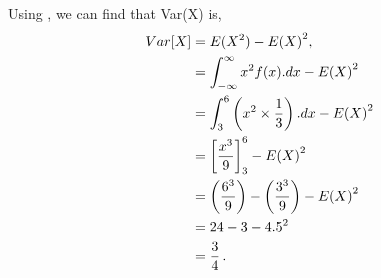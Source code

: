 \begin{subquestions}
\begin{subsubquestions}
Using , we can find that Var(X) is,
\begin{align}
	Var[X] & = E(X^2) - {E(X)}^2, \nonumber \\\
		   & = \int_{-\infty}^{\infty}x^2 f(x).dx - {E(X)}^2 \nonumber \\
		   & = \int_{3}^{6} \left( x^2 \times \frac{1}{3} \right).dx - {E(X)}^2 \nonumber \\
		   & = \left[\frac{x^3}{9} \right]^{6}_{3} - {E(X)}^2 \nonumber \\
		   & = \left( \frac{6^3}{9} \right) - \left( \frac{3^3}{9} \right) - {E(X)}^2 \nonumber \\
		   & = 24 -3 - 4.5^2 \nonumber \\
		   & = \frac{3}{4} \,.
\end{align}

\end{subsubquestions}

\end{subquestions}
